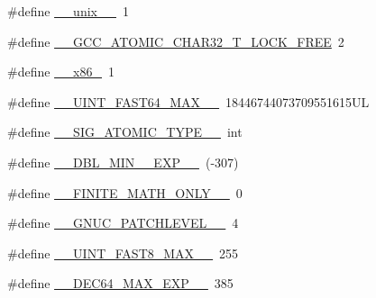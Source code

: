 \begin{DoxyCompactItemize}
\item 
\#define \hyperlink{build-analizer__host-_desktop___qt__5__9__0___g_c_c__64bit-debug_2moc__predefs_8h_aa5be39d362c571d48d6236f0bd58f1fc}{\+\_\+\+\_\+unix\+\_\+\+\_\+}~1
\item 
\#define \hyperlink{build-analizer__host-_desktop___qt__5__9__0___g_c_c__64bit-debug_2moc__predefs_8h_a98e298953067135caf4bc0b8e8e7cd01}{\+\_\+\+\_\+\+G\+C\+C\+\_\+\+A\+T\+O\+M\+I\+C\+\_\+\+C\+H\+A\+R32\+\_\+\+T\+\_\+\+L\+O\+C\+K\+\_\+\+F\+R\+E\+E}~2
\item 
\#define \hyperlink{build-analizer__host-_desktop___qt__5__9__0___g_c_c__64bit-debug_2moc__predefs_8h_a64b6ba77bbc2cb5db2a19f32e954fcc3}{\+\_\+\+\_\+x86\+\_}~1
\item 
\#define \hyperlink{build-analizer__host-_desktop___qt__5__9__0___g_c_c__64bit-debug_2moc__predefs_8h_a17a1ff08595cf7e0c9d1f162b727ccb6}{\+\_\+\+\_\+\+U\+I\+N\+T\+\_\+\+F\+A\+S\+T64\+\_\+\+M\+A\+X\+\_\+\+\_\+}~18446744073709551615\+U\+L
\item 
\#define \hyperlink{build-analizer__host-_desktop___qt__5__9__0___g_c_c__64bit-debug_2moc__predefs_8h_ac60fe3845f87fdaf6365a733ede87cfe}{\+\_\+\+\_\+\+S\+I\+G\+\_\+\+A\+T\+O\+M\+I\+C\+\_\+\+T\+Y\+P\+E\+\_\+\+\_\+}~int
\item 
\#define \hyperlink{build-analizer__host-_desktop___qt__5__9__0___g_c_c__64bit-debug_2moc__predefs_8h_a1abd7cf346a460459d7fe1a9d4b5dde9}{\+\_\+\+\_\+\+D\+B\+L\+\_\+\+M\+I\+N\+\_\+\_\+\+E\+X\+P\+\_\+\+\_\+}~(-\/307)
\item 
\#define \hyperlink{build-analizer__host-_desktop___qt__5__9__0___g_c_c__64bit-debug_2moc__predefs_8h_a611d40c375b1972669292fd27bc4afb7}{\+\_\+\+\_\+\+F\+I\+N\+I\+T\+E\+\_\+\+M\+A\+T\+H\+\_\+\+O\+N\+L\+Y\+\_\+\+\_\+}~0
\item 
\#define \hyperlink{build-analizer__host-_desktop___qt__5__9__0___g_c_c__64bit-debug_2moc__predefs_8h_ad149c0565fcf669b23f483e5b7f80dbd}{\+\_\+\+\_\+\+G\+N\+U\+C\+\_\+\+P\+A\+T\+C\+H\+L\+E\+V\+E\+L\+\_\+\+\_\+}~4
\item 
\#define \hyperlink{build-analizer__host-_desktop___qt__5__9__0___g_c_c__64bit-debug_2moc__predefs_8h_a27b5eb7cfda61c7f1baeb4d95f3052bb}{\+\_\+\+\_\+\+U\+I\+N\+T\+\_\+\+F\+A\+S\+T8\+\_\+\+M\+A\+X\+\_\+\+\_\+}~255
\item 
\#define \hyperlink{build-analizer__host-_desktop___qt__5__9__0___g_c_c__64bit-debug_2moc__predefs_8h_a3d4fe0f0b2e3ae12569d4a663dee8a0c}{\+\_\+\+\_\+\+D\+E\+C64\+\_\+\+M\+A\+X\+\_\+\+E\+X\+P\+\_\+\+\_\+}~385
\item 

\end{DoxyCompactItemize}
